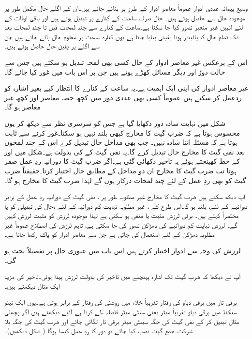 وسیع پیمانہ عددی ادوار عموماً معاصر  ادوار کے  طرز پر بنائے جاتے ہیں۔ان کے اگلے حال مکمل طور  پر  موجودہ حال سے  حاصل ہوتے ہیں۔ حال صرف ساعت کے کنارے پر تبدیل ہوتے ہیں اور باقی  اوقات کے لئے  انہیں غیر متغیر تصور کیا جا سکتا ہے۔ساعت کے کنارے سے چند لمحات قبل  تا  چند لمحات بعد تک       تمام حال کا   پائیدار  ہونا  یقینی بنایا جاتا ہے۔یوں کنارہ  ساعت    پر  معلوم حال پائے جاتے ہیں جن سے اگلے  پر  یقین حال  حاصل  ہوتے ہیں۔ 

اس کے برعکس غیر معاصر ادوار کے حال کسی بھی لمحہ تبدیل ہو سکتے ہیں جس سے حالت  دوڑ اور دیگر مسائل کھڑے ہوتے ہیں جن پر اس باب میں غور کیا جائے گا۔

غیر معاصر ادوار کی اپنی ایک اہمیت ہے۔یہ ساعت کے کنارے کا انتظار کیے بغیر اشارہ  کو ردعمل کر سکتے ہیں۔عموماً کسی بھی عددی دور میں کچھ حصہ معاصر اور کچھ غیر معاصر ہو گا۔

شکل میں نہایت سادہ دور دکھایا گیا ہے جس کو سرسری نظر سے    دیکھ کر  یوں محسوس ہوتا ہے کہ ضرب گیٹ کا  مخارج کبھی بلند نہیں ہو سکتا۔غور کرنے سے ثابت ہوتا ہے کہ مسئلہ اتنا سادہ نہیں۔ جب بھی مداخل   حال تبدیل کرے  اس کے  چند لمحوں بعد نفی گیٹ کا مخارج حال تبدیل کرے گا۔یہ  نفی گیٹ کے   کی بدولت ہے۔شکل میں   اور   کے خط کھینچتے ہوئے یہ    تاخیر دکھائی گئی ہے۔اگر ضرب گیٹ کا دورانیہ ردِ عمل صفر ہوتا تب ضرب گیٹ کا مخارج ان دو مداخل کے مطابق حال   اختیار کرتا۔حقیقتاً  ضرب گیٹ کو بھی ردِ عمل کے لئے چند لمحات درکار ہوں گے لہٰذا ضرب گیٹ کا مخارج   ہو گا۔

آپ دیکھ سکتے ہیں  ضرب گیٹ کا مخارج غیر مطلوبہ طور پر ، نفی گیٹ کے دورانیہ ردِ عمل کے برابر  دورانیے کے لئے، بلند ہو گا۔اس طرح کے  ، غیر مطلوبہ نہایت کم دورانیہ کے لئے ،حال کی تبدیلی کو یا مختصراً     کہتے ہیں۔ برقی لرزش مثبت یا منفی ہو سکتی ہے لہٰذا موجودہ لرزش کو مثبت لرزش کہیں گے۔  لرزش  نہایت کم دورانیے کی دھڑکن تصور کی جا سکتی ہے، تاہم  لرزش کی اصطلاح عموماً غیر مطلوبہ  دھڑکن کے لئے استعمال کی جاتی ہے جن سے معاصر ادوار   کو پاک رکھا جاتا ہے۔

 لرزش کی وجہ سے ادوار    اختیار کرتے ہیں۔اس باب میں عبوری حال  پر تفصیلاً بحث ہو گی۔  

آپ نے دیکھا کہ ضرب گیٹ تک   اشارہ  پہنچنے میں تاخیر کی بدولت لرزش پیدا ہوئی۔تاخیر کی مزید  ایک  مثال دیکھتے ہیں۔

برقی تار میں برقی دباو کی رفتار تقریباً خلاء میں روشنی کی  رفتار کے برابر ہوتی ہے۔یوں ایک نینو      سیکنڈ  میں برقی دباو تقریباً   میٹر یعنی  سنٹی میٹر فاصلہ طے کرتا ہے۔آئیے دیکھتے ہیں  اگر پچھلی مثال  تبدیل کر کے نفی گیٹ کی جگہ   سینٹی میٹر برقی تار لگائی جائے اور ضرب گیٹ کی جگہ بلا شرکت جمع گیٹ نصب کیا جائے تو دور کا ردِ عمل کیسا ہوگا ( شکل دیکھیں)۔


